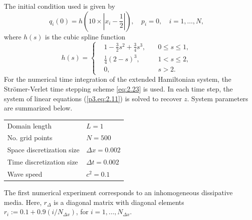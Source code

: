 The initial condition used is given by
\begin{equation} \label{p3.eq:4.5}
	q_i(0) = h( 10\times|x_i - \frac{1}{2}| ), \quad p_i = 0, \quad i=1,\dots,N,
\end{equation}
where $h(s)$ is the cubic spline function
\begin{equation} \label{p3.eq:4.6}
h(s) = 
\left\{
\begin{aligned}
& 1 - \frac{3}{2}s^2 + \frac{3}{4}s^3, \quad & 0\leq s \leq 1, \\
& \frac{1}{4}(2-s)^3, & 1< s \leq 2, \\
& 0, & s > 2.
\end{aligned}
\right.
\end{equation}
For the numerical time integration of the extended Hamiltonian system, the Str\"omer-Verlet time stepping scheme \eqref{eq:2.23} is used. In each time step, the system of linear equations (\ref{p3.eq:2.11}) is solved to recover $z$. System parameters are summarized below.
\vspace{0.5cm}
\begin{center}
\begin{tabular}{|l|l|}
\hline
Domain length & $L = 1$ \\
No. grid points & $N = 500$ \\
Space discretization size & $\Delta x = 0.002$ \\
Time discretization size & $\Delta t = 0.002$ \\
Wave speed & $c^2 = 0.1$ \\
\hline
\end{tabular}
\end{center}
\vspace{0.5cm}
The first numerical experiment corresponds to an inhomogeneous dissipative media. Here, $r_{\Delta}$ is a diagonal matrix with diagonal elements $r_i := 0.1 + 0.9(i/N_{\Delta x})$, for $i=1,\dots,N_{\Delta x}$.


